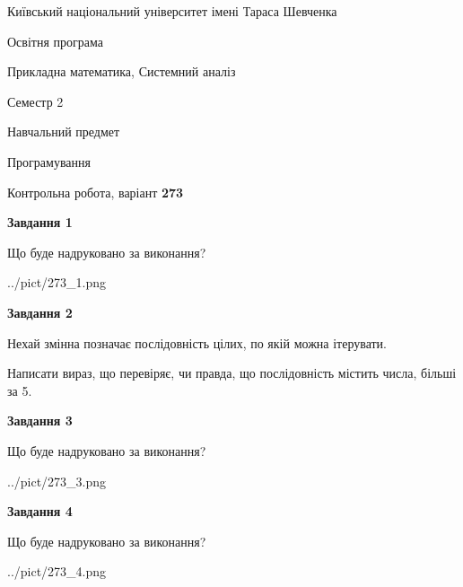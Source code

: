 \documentclass[12pt, ukrainian]{article}
\begin{document}
{{\begin {small}\par
{ \center  Київський національний університет імені Тараса Шевченка \par}
{\parbox {5 cm}{Освітня програма \hfill}{\parbox {8 cm}{Прикладна математика, Системний аналіз \hfill}}\parbox {5 cm}{\hfill Семестр 2}}\par
{\parbox {5 cm} {Навчальний предмет \hfill}\parbox {7 cm}{Програмування \hfill}\parbox {6cm}{\hfill}\par}\vspace{-7pt} \end{small}}{\center Контрольна робота, варіант  \No \textbf
{ 273 }\par}}
{
\begin {large}
{\begin {center}\textbf{Завдання 1}\end {center}}\par
Що буде надруковано за виконання?\par\par
\begin{center}
	{../pict/273_1.png}
\end{center}
\newpage

{\begin {center}\textbf{Завдання 2}\end {center}}\par
Нехай змінна  позначає послідовність цілих, по якій можна ітерувати.

Написати вираз, що перевіряє, чи правда, що послідовність  містить числа, більші за 5.\par
\newpage

{\begin {center}\textbf{Завдання 3}\end {center}}\par
Що буде надруковано за виконання?
\begin{center}
	{../pict/273_3.png}
\end{center}
\newpage

{\begin {center}\textbf{Завдання 4}\end {center}}\par
Що буде надруковано за виконання?\par
\begin{center}
	{../pict/273_4.png}
\end{center}
\newpage


\end{large}}
\end{document}
